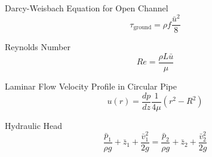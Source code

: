 \documentclass[twoside]{article}
\numberwithin{equation}{section}
\begin{document}
	Darcy-Weisbach Equation for Open Channel
	\begin{equation*}
		\tau_{\text{ground}} = \rho f \frac{\bar{u}^2}{8}
	\end{equation*}
	
	Reynolds Number
	\begin{equation*}
		Re = \frac{\rho L \bar{u}}{\mu}
	\end{equation*}
	
	Laminar Flow Velocity Profile in Circular Pipe
	\begin{equation*}
		u(r) = \frac{dp}{dz} \frac{1}{4\mu} \left( r^2-R^2 \right)
	\end{equation*}
	
	Hydraulic Head
	\begin{equation*}
		\frac{\bar{p}_1}{\rho g}+\bar{z}_1+\frac{\bar{v}_1^2}{2g} = \frac{\bar{p}_2}{\rho g}+\bar{z}_2+\frac{\bar{v}_2^2}{2g}
	\end{equation*}
	
\end{document}

